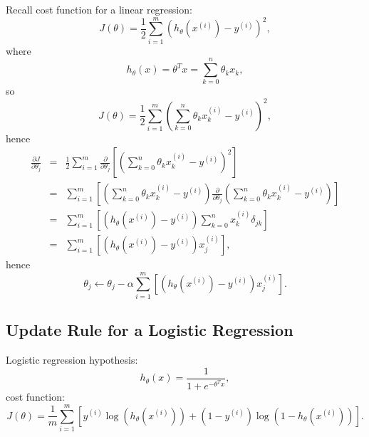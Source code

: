 \documentclass[a4paper,11pt]{article}
\begin{document}
Recall cost function for a linear regression:
\begin{equation}
J \left( \theta \right) = \frac{1}{2} \sum_{i=1} ^m \left(h_\theta \left( x^{(i)} \right) - y^{(i)} \right)^2 ,
\end{equation}
where
\begin{equation}
h_\theta \left( x \right) = \theta^T x = \sum_{k = 0} ^n \theta_k x_k ,
\end{equation}
so
\begin{equation}
J \left( \theta \right) = \frac{1}{2} \sum_{i=1} ^m \left( \sum_{k = 0} ^n \theta_k x_k ^{(i)} - y^{(i)} \right)^2 ,
\end{equation}
hence
\begin{eqnarray}
\frac{\partial J}{\partial \theta_j} &=& \frac{1}{2} \sum_{i=1} ^m \frac{\partial}{\partial \theta_j} \left[ \left( \sum_{k = 0} ^n \theta_k x_k ^{(i)} - y^{(i)} \right)^2 \right]\\
 &=& \sum_{i=1} ^m \left[ \left( \sum_{k = 0} ^n \theta_k x_k ^{(i)} - y^{(i)} \right) \frac{\partial}{\partial \theta_j} \left( \sum_{k = 0} ^n \theta_k x_k ^{(i)} - y^{(i)} \right) \right] \\
 &=& \sum_{i=1} ^m \left[ \left( h_\theta \left( x^{(i)} \right) - y^{(i)} \right) \sum_{k = 0} ^n x_k ^{(i)} \delta_{jk} \right] \\
 &=& \sum_{i=1} ^m \left[ \left( h_\theta \left( x^{(i)} \right) - y^{(i)} \right) x_j ^{(i)} \right],
\end{eqnarray}
hence
\begin{equation}
\theta_j \leftarrow \theta_j - \alpha \sum_{i=1} ^m \left[ \left( h_\theta \left( x^{(i)} \right) - y^{(i)} \right) x_j ^{(i)} \right] .
\end{equation}
\subsection{Update Rule for a Logistic Regression}
Logistic regression hypothesis:
\begin{equation}
h_\theta (x) = \frac{1}{1 + e^{-\theta^T x}} ,
\end{equation}
cost function:
\begin{equation}
J \left( \theta \right) = \frac{1}{m} \sum_{i = 1} ^m \left[ y^{(i)} \log \left(h_\theta (x^{(i)}) \right) + \left(1 - y^{(i)} \right) \log \left(1 - h_\theta (x^{(i)}) \right) \right] .
\end{equation}
\end{document}
